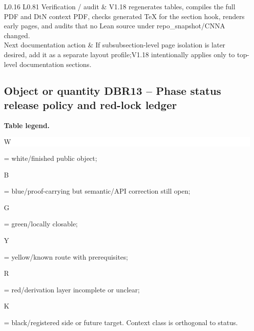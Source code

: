 \begin{longtable}{L{0.16\linewidth} L{0.81\linewidth}}
\hline\addlinespace[0.20em]
Verification /\allowbreak{} audit & V1.18 regenerates tables, compiles the full PDF and DtN context PDF, checks generated TeX for the section hook, renders early pages, and audits that no Lean source under repo\_snapshot/\allowbreak{}CNNA changed.\\
\hline\addlinespace[0.20em]
Next documentation action & If subsubsection-level page isolation is later desired, add it as a separate layout profile;\newline V1.18 intentionally applies only to top-level documentation sections.\\
\hline\addlinespace[0.20em]
\end{longtable}
\subsection*{Object or quantity DBR13 -- Phase status release policy and red-lock ledger}
\hypertarget{objproof:DBR13}{}
\par\smallskip\noindent\begin{minipage}{0.99\linewidth}\footnotesize\raggedright\textbf{Table legend.} \colorbox{white}{\strut W} = white/finished public object; \colorbox{cyan!20}{\strut B} = blue/proof-carrying but semantic/API correction still open; \colorbox{green!18}{\strut G} = green/locally closable; \colorbox{yellow!25}{\strut Y} = yellow/known route with prerequisites; \colorbox{red!20}{\strut R} = red/derivation layer incomplete or unclear; \colorbox{black!18}{\strut K} = black/registered side or future target. Context class is orthogonal to status.\end{minipage}\par\vspace{0.25em}
